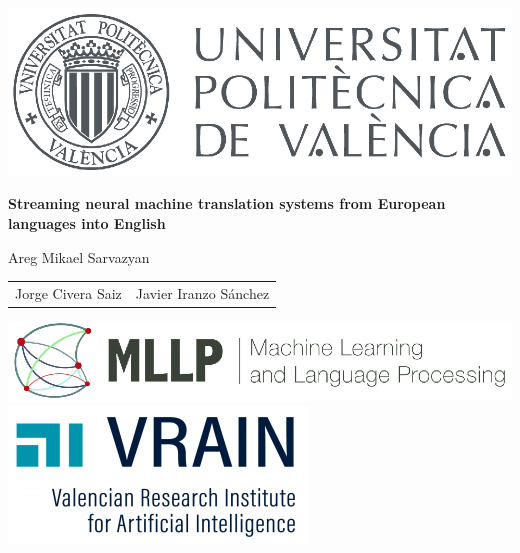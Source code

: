 \documentclass[landscape]{article}
\renewcommand{\author}{Areg Mikael Sarvazyan}
\renewcommand{\title}{Streaming neural machine translation systems from European languages into English}
\begin{document}

\thispagestyle{empty}

\begin{center}

\centerline{\includegraphics[height=0.15\textheight]{figures/UPV-logo}}

\rule{0mm}{20mm}
\Large{\Large\textbf{\color{darkred}\title}}

\rule{0mm}{30mm}
{\normalsize \color{greyblue}\author}

\rule{0mm}{0mm}
\begin{table}[ht!]
    \begin{tabularx}{\textwidth}{YY}
        \small \color{greyblue} Jorge Civera Saiz & \small \color{greyblue} Javier Iranzo Sánchez\\
    \end{tabularx}
\end{table}

\end{center}

\centerline{\includegraphics[height=0.12\textheight]{figures/MLLP_Brand} \qquad \qquad \includegraphics[height=0.15\textheight]{figures/vrain.png}}

\normalsize\small
\vspace{10mm}
\end{document}
